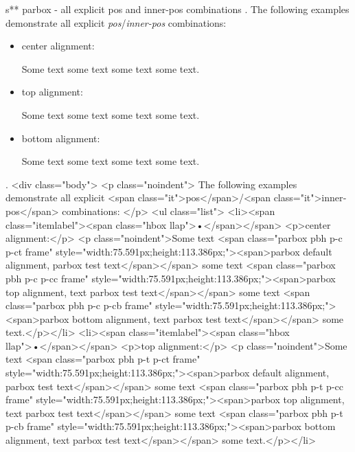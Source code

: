 s** parbox - all explicit pos and inner-pos combinations
.
\noindent
The following examples demonstrate all explicit \emph{pos}/\emph{inner-pos} combinations:
\begin{itemize}
\item center alignment:

\noindent
Some text
some text
some text
some text.

\item top alignment:

\noindent
Some text
some text
some text
some text.

\item bottom alignment:

\noindent
Some text
some text
some text
some text.
\end{itemize}
.
<div class="body">
<p class="noindent">
The following examples demonstrate all explicit <span class="it">pos</span>/<span class="it">inner‐pos</span> combinations:
</p>
<ul class="list">
<li><span class="itemlabel"><span class="hbox llap">•</span></span>
<p>center alignment:</p>
<p class="noindent">Some text <span class="parbox pbh p-c p-ct frame" style="width:75.591px;height:113.386px;"><span>parbox default alignment, parbox test text</span></span> some text <span class="parbox pbh p-c p-cc frame" style="width:75.591px;height:113.386px;"><span>parbox top alignment, text parbox test text</span></span> some text <span class="parbox pbh p-c p-cb frame" style="width:75.591px;height:113.386px;"><span>parbox bottom alignment, text parbox test text</span></span> some text.</p></li>
<li><span class="itemlabel"><span class="hbox llap">•</span></span>
<p>top alignment:</p>
<p class="noindent">Some text <span class="parbox pbh p-t p-ct frame" style="width:75.591px;height:113.386px;"><span>parbox default alignment, parbox test text</span></span> some text <span class="parbox pbh p-t p-cc frame" style="width:75.591px;height:113.386px;"><span>parbox top alignment, text parbox test text</span></span> some text <span class="parbox pbh p-t p-cb frame" style="width:75.591px;height:113.386px;"><span>parbox bottom alignment, text parbox test text</span></span> some text.</p></li>
